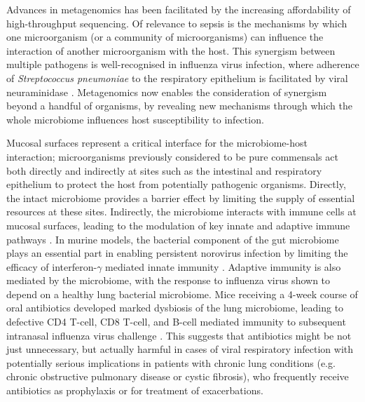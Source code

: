 Advances in metagenomics has been facilitated by the increasing affordability of high-throughput sequencing. Of relevance to sepsis is the mechanisms by which one microorganism (or a community of microorganisms) can influence the interaction of another microorganism with the host. This synergism between multiple pathogens is well-recognised in influenza virus infection, where adherence of \textit{Streptococcus pneumoniae} to the respiratory epithelium is facilitated by viral neuraminidase \parencite{Peltola2005}. Metagenomics now enables the consideration of synergism beyond a handful of organisms, by revealing new mechanisms through which the whole microbiome influences host susceptibility to infection.

Mucosal surfaces represent a critical interface for the microbiome-host interaction; microorganisms previously considered to be pure commensals act both directly and indirectly at sites such as the intestinal and respiratory epithelium to protect the host from potentially pathogenic organisms. Directly, the intact microbiome provides a barrier effect by limiting the supply of essential resources at these sites. Indirectly, the microbiome interacts with immune cells at mucosal surfaces, leading to the modulation of key innate and adaptive immune pathways \parencite{Thaiss2016}. In murine models, the bacterial component of the gut microbiome plays an essential part in enabling persistent norovirus infection by limiting the efficacy of interferon-$\gamma$ mediated innate immunity \parencite{Baldridge2015}. Adaptive immunity is also mediated by the microbiome, with the response to influenza virus shown to depend on a healthy lung bacterial microbiome. Mice receiving a 4-week course of oral antibiotics developed marked dysbiosis of the lung microbiome, leading to defective CD4 T-cell, CD8 T-cell, and B-cell mediated immunity to subsequent intranasal influenza virus challenge \parencite{Ichinohe2011}. This suggests that antibiotics might be not just unnecessary, but actually harmful in cases of viral respiratory infection with potentially serious implications in patients with chronic lung conditions (e.g. chronic obstructive pulmonary disease or cystic fibrosis), who frequently receive antibiotics as prophylaxis or for treatment of exacerbations. 

